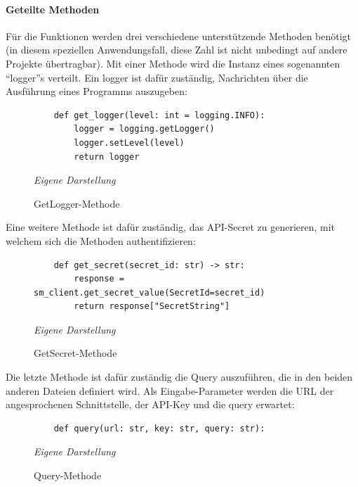 \paragraph{Geteilte Methoden}
Für die Funktionen werden drei verschiedene unterstützende Methoden benötigt (in diesem speziellen Anwendungsfall, diese Zahl ist nicht unbedingt auf andere Projekte übertragbar). Mit einer Methode wird die Instanz eines sogenannten ``logger''s verteilt. Ein logger ist dafür zuständig, Nachrichten über die Ausführung eines Programms auszugeben:\newline
	\begin{figure}[H]
	\centering
	\begin{minipage}[t]{.7\textwidth} %
	\caption{GetLogger-Methode} %
	\begin{verbatim}
	def get_logger(level: int = logging.INFO):
	    logger = logging.getLogger()
	    logger.setLevel(level)
	    return logger
	\end{verbatim}
	
	\textit{Eigene Darstellung} %
	\label{fig:getLoggerMethode}
	\end{minipage}
	\end{figure}
Eine weitere Methode ist dafür zuständig, das API-Secret zu generieren, mit welchem sich die Methoden authentifizieren:\newline
	\begin{figure}[H]
	\centering
	\begin{minipage}[t]{.7\textwidth} %
	\caption{GetSecret-Methode} %
	\begin{verbatim}
	def get_secret(secret_id: str) -> str:
	    response = sm_client.get_secret_value(SecretId=secret_id)
	    return response["SecretString"]
	\end{verbatim}
	
	\textit{Eigene Darstellung} %
	\label{fig:getSecretMethode}
	\end{minipage}
	\end{figure}
Die letzte Methode ist dafür zuständig die Query auszuführen, die in den beiden anderen Dateien definiert wird. Als Eingabe-Parameter werden die URL der angesprochenen Schnittstelle, der API-Key und die query erwartet:\newline
	\begin{figure}[H]
	\centering
	\begin{minipage}[t]{.7\textwidth} %
	\caption{Query-Methode} %
	\begin{verbatim}
	def query(url: str, key: str, query: str):
	\end{verbatim}
	
	\textit{Eigene Darstellung} %
	\label{fig:queryMethode}
	\end{minipage}
	\end{figure}
